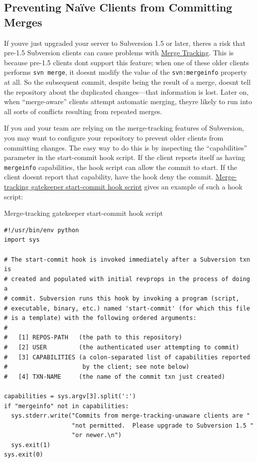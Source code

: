 \subsection{Preventing Naïve Clients from Committing
Merges}\label{svn.branchmerge.advanced.pre1.5clients}

If you\textquotesingle ve just upgraded your server to Subversion 1.5 or
later, there\textquotesingle s a risk that pre-1.5 Subversion clients
can cause problems with
\hyperref[svn.branchmerge.basicmerging.mergetracking]{Merge Tracking}.
This is because pre-1.5 clients don\textquotesingle t support this
feature; when one of these older clients performs \texttt{svn\ merge},
it doesn\textquotesingle t modify the value of the
\texttt{svn:mergeinfo} property at all. So the subsequent commit,
despite being the result of a merge, doesn\textquotesingle t tell the
repository about the duplicated changes---that information is lost.
Later on, when ``merge-aware'' clients attempt automatic merging,
they\textquotesingle re likely to run into all sorts of conflicts
resulting from repeated merges.

If you and your team are relying on the merge-tracking features of
Subversion, you may want to configure your repository to prevent older
clients from committing changes. The easy way to do this is by
inspecting the ``capabilities'' parameter in the start-commit hook
script. If the client reports itself as having \texttt{mergeinfo}
capabilities, the hook script can allow the commit to start. If the
client doesn\textquotesingle t report that capability, have the hook
deny the commit.
\hyperref[svn.branchmerge.advanced.hook-ex1]{Merge-tracking gatekeeper
start-commit hook script} gives an example of such a hook script:

\protect{}\label{svn.branchmerge.advanced.hook-ex1}
Merge-tracking gatekeeper start-commit hook script

\begin{verbatim}
#!/usr/bin/env python
import sys

# The start-commit hook is invoked immediately after a Subversion txn is
# created and populated with initial revprops in the process of doing a
# commit. Subversion runs this hook by invoking a program (script, 
# executable, binary, etc.) named 'start-commit' (for which this file
# is a template) with the following ordered arguments:
#
#   [1] REPOS-PATH   (the path to this repository)
#   [2] USER         (the authenticated user attempting to commit)
#   [3] CAPABILITIES (a colon-separated list of capabilities reported
#                     by the client; see note below)
#   [4] TXN-NAME     (the name of the commit txn just created)

capabilities = sys.argv[3].split(':')
if "mergeinfo" not in capabilities:
  sys.stderr.write("Commits from merge-tracking-unaware clients are "
                   "not permitted.  Please upgrade to Subversion 1.5 "
                   "or newer.\n")
  sys.exit(1)
sys.exit(0)
\end{verbatim}

